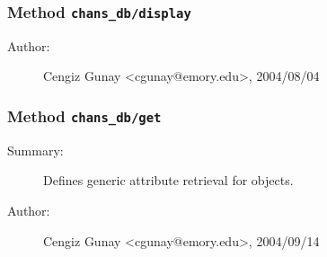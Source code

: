 \subsubsection[Method \texttt{display}]{Method \texttt{chans\_db/display}}%
%
\label{ref_chans_db__display}%
\hypertarget{ref_chans_db__display}{}%
\begin{description}
%
%
%
%
%
%
%
\item[Author:]%
Cengiz Gunay <cgunay@emory.edu>, 2004/08/04
%
\end{description}
\methodline%
\subsubsection[Method \texttt{get}]{Method \texttt{chans\_db/get}}%
%
\label{ref_chans_db__get}%
\hypertarget{ref_chans_db__get}{}%
\begin{description}
\item[Summary:]Defines generic attribute retrieval for objects.
%
%
%
%
%
%
%
\item[Author:]%
Cengiz Gunay <cgunay@emory.edu>, 2004/09/14
%
\end{description}
\methodline%
